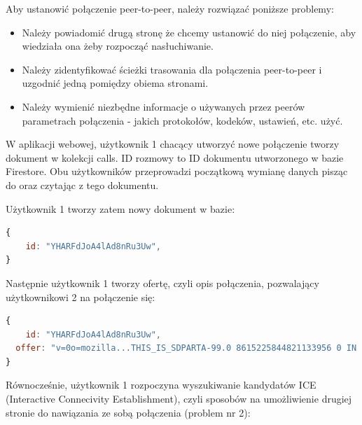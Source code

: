 Aby ustanowić połączenie peer-to-peer, należy rozwiązać poniższe problemy: \cite{hpbn}

\begin{itemize}
  \item Należy powiadomić drugą stronę że chcemy ustanowić do niej połączenie, aby wiedziała ona żeby rozpocząć
        nasłuchiwanie.
  \item Należy zidentyfikować ścieżki trasowania dla połączenia peer-to-peer i uzgodnić jedną pomiędzy obiema stronami.
  \item Należy wymienić niezbędne informacje o używanych przez peerów parametrach połączenia - jakich protokołów,
        kodeków, ustawień, etc. użyć.
\end{itemize}

W aplikacji webowej, użytkownik 1 chacący utworzyć nowe połączenie tworzy dokument w kolekcji calls. ID rozmowy to ID
dokumentu utworzonego w bazie Firestore. Obu użytkowników przeprowadzi początkową wymianę danych pisząc do oraz czytając
z tego dokumentu.

Użytkownik 1 tworzy zatem nowy dokument w bazie:

\begin{lstlisting}[language=Javascript,label=list:call-doc-1, caption=Dokument połączenia po utworzeniu przez użytkownika 1,
basicstyle=\footnotesize \ttfamily, showtabs=true, tabsize=4]
{
	id: "YHARFdJoA4lAd8nRu3Uw",
}
\end{lstlisting}

Następnie użytkownik 1 tworzy ofertę, czyli opis połączenia, pozwalający użytkownikowi 2 na połączenie się:

\begin{lstlisting}[language=Javascript,label=list:call-doc-2, caption=Dokument połączenia po dodaniu opisu sesji w protokole SDP,
basicstyle=\footnotesize \ttfamily, showtabs=true, tabsize=4]
{
	id: "YHARFdJoA4lAd8nRu3Uw",
  offer: "v=0o=mozilla...THIS_IS_SDPARTA-99.0 8615225844821133956 0 IN IP4 0.0.0.0s=-t=0 0a=fingerprint:sha-256 5F:A8:8A:A5:B8:1D:0C:39:21:93:FA:3A:B2:B7:B6:3F:EF:8A:5D:3C:6E:86:2E:A7:0A:D4:F0:E3:58:E0:E2:7B..."
}
\end{lstlisting}

Równocześnie, użytkownik 1 rozpoczyna wyszukiwanie kandydatów ICE (Interactive Connecivity Establishment), czyli
sposobów na umożliwienie drugiej stronie do nawiązania ze sobą połączenia (problem nr 2):

